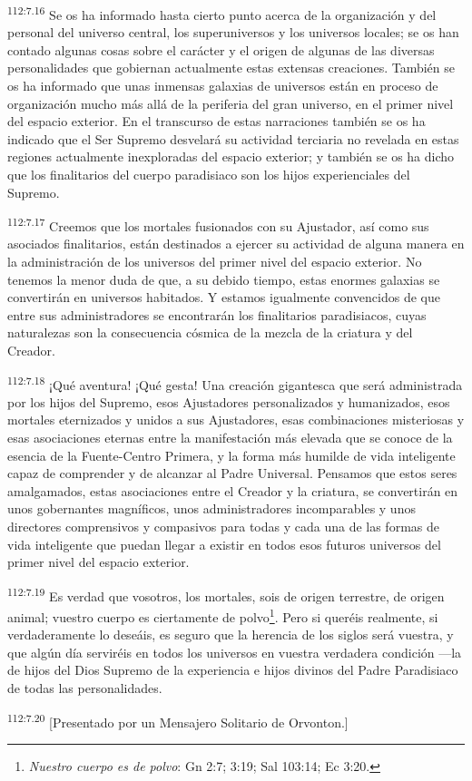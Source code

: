 \par
\textsuperscript{112:7.16} Se os ha informado hasta cierto punto acerca de la organización y del personal del universo central, los superuniversos y los universos locales; se os han contado algunas cosas sobre el carácter y el origen de algunas de las diversas personalidades que gobiernan actualmente estas extensas creaciones. También se os ha informado que unas inmensas galaxias de universos están en proceso de organización mucho más allá de la periferia del gran universo, en el primer nivel del espacio exterior. En el transcurso de estas narraciones también se os ha indicado que el Ser Supremo desvelará su actividad terciaria no revelada en estas regiones actualmente inexploradas del espacio exterior; y también se os ha dicho que los finalitarios del cuerpo paradisiaco son los hijos experienciales del Supremo.

\par
\textsuperscript{112:7.17} Creemos que los mortales fusionados con su Ajustador, así como sus asociados finalitarios, están destinados a ejercer su actividad de alguna manera en la administración de los universos del primer nivel del espacio exterior. No tenemos la menor duda de que, a su debido tiempo, estas enormes galaxias se convertirán en universos habitados. Y estamos igualmente convencidos de que entre sus administradores se encontrarán los finalitarios paradisiacos, cuyas naturalezas son la consecuencia cósmica de la mezcla de la criatura y del Creador.

\par
\textsuperscript{112:7.18} ¡Qué aventura! ¡Qué gesta! Una creación gigantesca que será administrada por los hijos del Supremo, esos Ajustadores personalizados y humanizados, esos mortales eternizados y unidos a sus Ajustadores, esas combinaciones misteriosas y esas asociaciones eternas entre la manifestación más elevada que se conoce de la esencia de la Fuente-Centro Primera, y la forma más humilde de vida inteligente capaz de comprender y de alcanzar al Padre Universal. Pensamos que estos seres amalgamados, estas asociaciones entre el Creador y la criatura, se convertirán en unos gobernantes magníficos, unos administradores incomparables y unos directores comprensivos y compasivos para todas y cada una de las formas de vida inteligente que puedan llegar a existir en todos esos futuros universos del primer nivel del espacio exterior.

\par
\textsuperscript{112:7.19} Es verdad que vosotros, los mortales, sois de origen terrestre, de origen animal; vuestro cuerpo es ciertamente de polvo\footnote{\textit{Nuestro cuerpo es de polvo}: Gn 2:7; 3:19; Sal 103:14; Ec 3:20.}. Pero si queréis realmente, si verdaderamente lo deseáis, es seguro que la herencia de los siglos será vuestra, y que algún día serviréis en todos los universos en vuestra verdadera condición ---la de hijos del Dios Supremo de la experiencia e hijos divinos del Padre Paradisiaco de todas las personalidades.

\par
\textsuperscript{112:7.20} [Presentado por un Mensajero Solitario de Orvonton.]